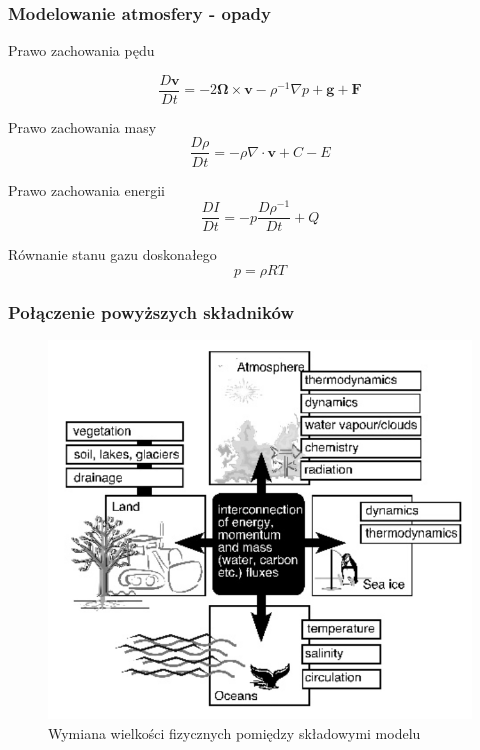 \documentclass{beamer}
\begin{document}
\begin{frame}
	\frametitle{Modelowanie atmosfery - opady}
	\begin{block}{Prawo zachowania pędu}
		
		\[\frac{D\mathbf{v}}{Dt} = -2 \mathbf{\Omega} \times \mathbf{v} - \rho^{-1}
		\nabla p + \mathbf{g} + \mathbf{F}
		\]
		
	\end{block}
	
	\begin{block}{Prawo zachowania masy}
		\[\frac{D\rho}{Dt} = -\rho\nabla \cdot \mathbf{v} + C - E
		\]
	\end{block}
	
	\begin{block}{Prawo zachowania energii}
		\[\frac{DI}{Dt} = -p\frac{D\rho^{-1}}{Dt} + Q
		\]
	\end{block}
	
	\begin{block}{Równanie stanu gazu doskonałego}		
		\[p=\rho RT
		\]
	\end{block}
	
\end{frame}

\begin{frame}
	\frametitle{Połączenie powyższych składników}
	\begin{figure}[h]
		\begin{center}
			\includegraphics[width=0.6\linewidth]{images/Figure6.png}
			\caption{Wymiana wielkości fizycznych pomiędzy składowymi modelu}
		\end{center}
	\end{figure}
\end{frame}


\end{document}
